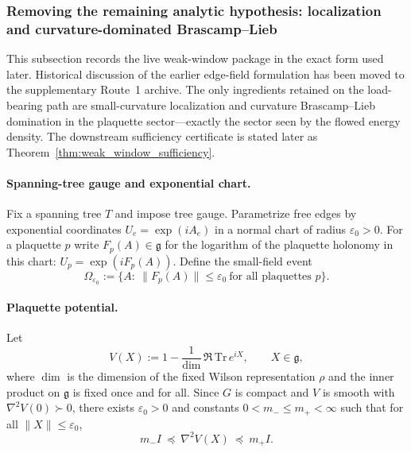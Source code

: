 \subsubsection{Removing the remaining analytic hypothesis: localization and curvature-dominated Brascamp--Lieb}
\label{subsec:convexity_to_stepscaling}
\label{subsec:curvature_domination}
This subsection records the live weak-window package in the exact form used later.
Historical discussion of the earlier edge-field formulation has been moved to the supplementary Route~1 archive.
The only ingredients retained on the load-bearing path are small-curvature localization and curvature
Brascamp--Lieb domination in the plaquette sector---exactly the sector seen by the flowed energy density.
The downstream sufficiency certificate is stated later as Theorem~\ref{thm:weak_window_sufficiency}.

\paragraph{Spanning-tree gauge and exponential chart.}
Fix a spanning tree $T$ and impose tree gauge. Parametrize free edges by exponential coordinates
$U_e=\exp(iA_e)$ in a normal chart of radius $\varepsilon_0>0$.
For a plaquette $p$ write $F_p(A)\in\mathfrak g$ for the logarithm of the plaquette holonomy in this chart:
\(U_p=\exp(iF_p(A))\).
Define the small-field event
\begin{equation}\label{eq:Omega_sf_def}
\Omega_{\varepsilon_0}:=\bigl\{A: \ \|F_p(A)\|\le \varepsilon_0\ \text{for all plaquettes }p\bigr\}.
\end{equation}

\paragraph{Plaquette potential.}
Let
\begin{equation}\label{eq:V_def}
V(X):=1-\frac{1}{\dim}\,\Re\,\mathrm{Tr}\,e^{iX},\qquad X\in\mathfrak g,
\end{equation}
where $\dim$ is the dimension of the fixed Wilson representation $\rho$ and the inner product on $\mathfrak g$ is fixed once and for all.
Since $G$ is compact and $V$ is smooth with $\nabla^2 V(0)\succ 0$, there exists $\varepsilon_0>0$ and constants
$0<m_-\le m_+<\infty$ such that for all $\|X\|\le \varepsilon_0$,
\begin{equation}\label{eq:V_hess_bounds}
m_- I\ \preceq\ \nabla^2 V(X)\ \preceq\ m_+ I.
\end{equation}


